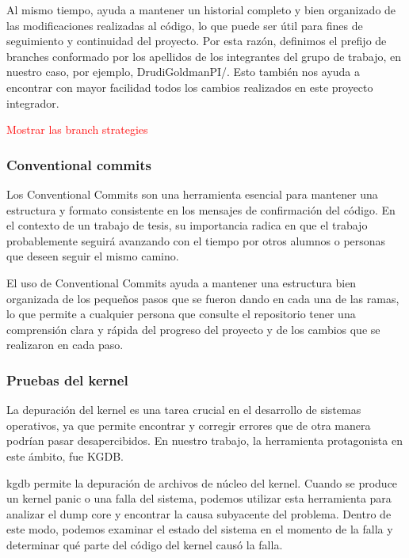 Al mismo tiempo, ayuda a mantener un historial completo y bien organizado de las modificaciones realizadas al código, lo que puede ser útil para fines de seguimiento y continuidad del proyecto. Por esta razón, definimos el prefijo de branches conformado por los apellidos de los integrantes del grupo de trabajo, en nuestro caso, por ejemplo, DrudiGoldmanPI/. Esto también nos ayuda a encontrar con mayor facilidad todos los cambios realizados en este proyecto integrador.\par

\textcolor{red}{Mostrar las branch strategies}

\subsubsection{Conventional commits}
Los Conventional Commits son una herramienta esencial para mantener una estructura y formato consistente en los mensajes de confirmación del código. En el contexto de un trabajo de tesis, su importancia radica en que el trabajo probablemente seguirá avanzando con el tiempo por otros alumnos o personas que deseen seguir el mismo camino.\par

El uso de Conventional Commits ayuda a mantener una estructura bien organizada de los pequeños pasos que se fueron dando en cada una de las ramas, lo que permite a cualquier persona que consulte el repositorio tener una comprensión clara y rápida del progreso del proyecto y de los cambios que se realizaron en cada paso.\par

\subsubsection{Pruebas del kernel}
La depuración del kernel es una tarea crucial en el desarrollo de sistemas operativos, ya que permite encontrar y corregir errores que de otra manera podrían pasar desapercibidos. En nuestro trabajo, la herramienta protagonista en este ámbito, fue KGDB.\par

kgdb permite la depuración de archivos de núcleo del kernel. Cuando se produce un kernel panic o una falla del sistema, podemos utilizar esta herramienta para analizar el dump core y encontrar la causa subyacente del problema. Dentro de  este modo, podemos examinar el estado del sistema en el momento de la falla y determinar qué parte del código del kernel causó la falla.\par





